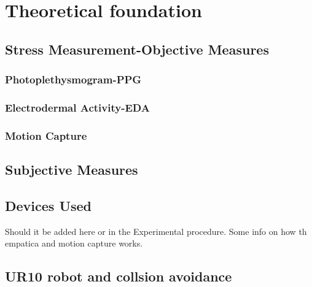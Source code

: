 \chapter{Theoretical foundation}

\section{Stress Measurement-Objective Measures}
\subsection{Photoplethysmogram-PPG}
\subsection{Electrodermal Activity-EDA}
\subsection{Motion Capture}
\section{Subjective Measures}
\section{Devices Used}
Should it be added here or in the Experimental procedure. Some info on how th empatica and motion capture works.
\section{UR10 robot and collsion avoidance }


